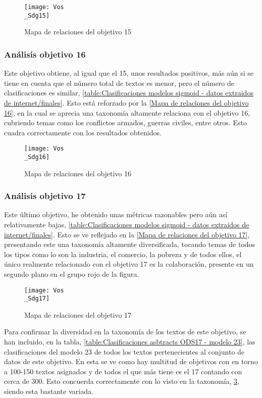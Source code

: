 \begin{figure}[H]
    \centering
    \texttt{[image: Vos\\\_Sdg15]}
    \captionsetup{justification=centering}
    \caption{Mapa de relaciones del objetivo 15}
    \label{Mapa de relaciones del objetivo 15}
\end{figure}


\subsubsection{Análisis objetivo 16}
Este objetivo obtiene, al igual que el 15, unos resultados positivos, más aún si
se tiene en cuenta que el número total de textos es menor, pero el número de
clasificaciones es similar, \cref{table:Clasificaciones modelos sigmoid - datos
extraidos de internet/finales}. Esto está reforzado por la \cref{Mapa de
relaciones del objetivo 16}, en la cual se aprecia una taxonomía altamente
relaciona con el objetivo 16, cubriendo temas como los conflictos armados,
guerras civiles, entre otros. Esto cuadra correctamente con los resultados
obtenidos.

\begin{figure}[H]
    \centering
    \texttt{[image: Vos\\\_Sdg16]}
    \captionsetup{justification=centering}
    \caption{Mapa de relaciones del objetivo 16}
    \label{Mapa de relaciones del objetivo 16}
\end{figure}

\subsubsection{Análisis objetivo 17}
Este último objetivo, he obtenido unas métricas razonables pero aún así
relativamente bajas, \cref{table:Clasificaciones modelos sigmoid - datos
extraidos de internet/finales}. Esto se ve reflejado en la \cref{Mapa de
relaciones del objetivo 17}, presentando este una taxonomía altamente
diversificada, tocando temas de todos los tipos como lo son la industria, el
comercio, la pobreza y de todos ellos, el único realmente relacionado con el
objetivo 17 es la colaboración, presente en un segundo plano en el grupo rojo de
la figura.
\begin{figure}[H]
    \centering
    \texttt{[image: Vos\\\_Sdg17]}
    \captionsetup{justification=centering}
    \caption{Mapa de relaciones del objetivo 17}
    \label{Mapa de relaciones del objetivo 17}
\end{figure}

Para confirmar la diversidad en la taxonomía de los textos de este objetivo, se
han incluido, en la tabla, \cref{table:Clasificaciones asbtracts ODS17 - modelo
23}, las clasificaciones del modelo 23 de todos los textos pertenecientes al
conjunto de datos de este objetivo. En esta se ve como hay multitud de objetivos
con en torno a 100-150 textos asignados y de todos el que más tiene es el 17
contando con cerca de 300. Esto concuerda correctamente con lo visto en la
taxonomía, \cref{Mapa de relaciones del objetivo 17}, siendo esta bastante variada.

